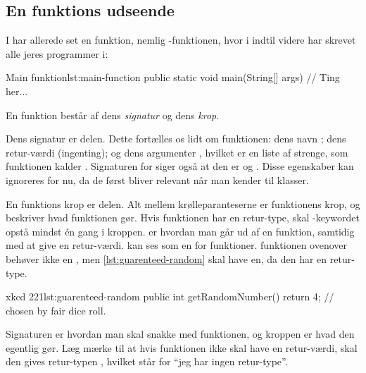 
	\subsection{En funktions udseende}

		I har allerede set en funktion, nemlig -funktionen, hvor i
		indtil videre har skrevet alle jeres programmer i:

		\begin{JavaCode}{Main funktion}{lst:main-function}
			public static void main(String[] args) {
				// Ting her...
			}
		\end{JavaCode}

		En funktion består af dens \emph{signatur} og dens \emph{krop}.

        Dens signatur er 
        delen.  Dette fortælles os lidt om funktionen: dens
        navn ; dens retur-værdi  (ingenting); og
        dens argumenter , hvilket er en liste af
        strenge, som funktionen kalder .  Signaturen for
         siger også at den er  og
        . Disse egenskaber kan ignoreres for nu, da de
        først bliver relevant når man kender til klasser.

        En funktions krop er  delen. Alt
        mellem krølleparanteserne er funktionens krop, og beskriver
        hvad funktionen gør.  Hvis funktionen har en retur-type, skal
        -keywordet opstå mindst én gang i kroppen.
         er hvordan man går ud af en funktion,
        samtidig med at give en retur-værdi.   kan
        ses som en  for funktioner.
         funktionen ovenover behøver ikke en
        , men \autoref{lst:guarenteed-random}
        skal have en, da den har en retur-type.

		\begin{JavaCode}{xkcd 221}{lst:guarenteed-random}
			public int getRandomNumber() {
				return 4;  // chosen by fair dice roll.
			}
		\end{JavaCode}

        Signaturen er hvordan man skal snakke med funktionen, og
        kroppen er hvad den egentlig gør. Læg mærke til at hvis
        funktionen ikke skal have en retur-værdi, skal den gives
        retur-typen , hvilket står for ``jeg har ingen retur-type''.

